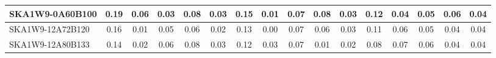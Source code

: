\begin{table}[H]
{{\begin{tabular}{|lccccc||ccccc||ccccc|}
SKA1W9-0A60B100 & 0.19 \cellcolor{blue!54.00} & 0.06 \cellcolor{red!44.25} & 0.03 \cellcolor{green!18.00} & 0.08 \cellcolor{orange!60.00} & 0.03 \cellcolor{purple!60.00} & 0.15 \cellcolor{blue!49.50} & 0.01 \cellcolor{red!23.25} & 0.07 \cellcolor{green!39.00} & 0.08 \cellcolor{orange!60.00} & 0.03 \cellcolor{purple!60.00} & 0.12 \cellcolor{blue!60.00} & 0.04 \cellcolor{red!32.00} & 0.05 \cellcolor{green!18.00} & 0.06 \cellcolor{orange!60.00} & 0.04 \cellcolor{purple!28.50}\\ \hline 
SKA1W9-12A72B120 & 0.16 \cellcolor{blue!36.00} & 0.01 \cellcolor{red!18.00} & 0.05 \cellcolor{green!34.80} & 0.06 \cellcolor{orange!18.00} & 0.02 \cellcolor{purple!18.00} & 0.13 \cellcolor{blue!39.00} & 0.00 \cellcolor{red!18.00} & 0.07 \cellcolor{green!39.00} & 0.06 \cellcolor{orange!48.00} & 0.03 \cellcolor{purple!60.00} & 0.11 \cellcolor{blue!53.00} & 0.06 \cellcolor{red!46.00} & 0.05 \cellcolor{green!18.00} & 0.04 \cellcolor{orange!18.00} & 0.04 \cellcolor{purple!28.50}\\ \hline 
SKA1W9-12A80B133 & 0.14 \cellcolor{blue!24.00} & 0.02 \cellcolor{red!23.25} & 0.06 \cellcolor{green!43.20} & 0.08 \cellcolor{orange!60.00} & 0.03 \cellcolor{purple!60.00} & 0.12 \cellcolor{blue!33.75} & 0.03 \cellcolor{red!33.75} & 0.07 \cellcolor{green!39.00} & 0.01 \cellcolor{orange!18.00} & 0.02 \cellcolor{purple!39.00} & 0.08 \cellcolor{blue!32.00} & 0.07 \cellcolor{red!53.00} & 0.06 \cellcolor{green!39.00} & 0.04 \cellcolor{orange!18.00} & 0.04 \cellcolor{purple!28.50}\\ \hline 
\end{tabular}}
\vspace{-0.300000cm}
\hspace{1cm} 
}
\end{table}
